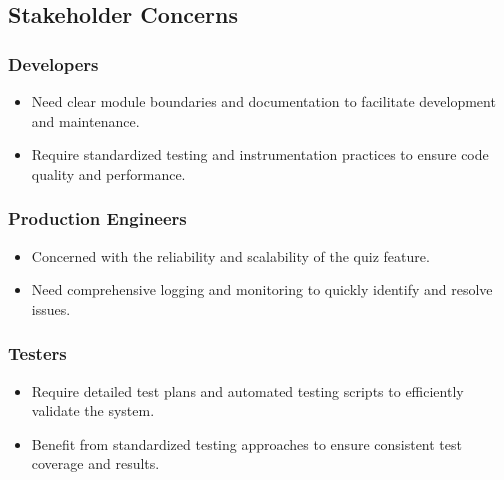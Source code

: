 \subsection{Stakeholder Concerns}

\subsubsection{Developers}

\begin{itemize}
  \item Need clear module boundaries and documentation to facilitate development and maintenance.
  \item Require standardized testing and instrumentation practices to ensure code quality and performance.
\end{itemize}

\subsubsection{Production Engineers}

\begin{itemize}
  \item Concerned with the reliability and scalability of the quiz feature.
  \item Need comprehensive logging and monitoring to quickly identify and resolve issues.
\end{itemize}

\subsubsection{Testers}

\begin{itemize}
  \item Require detailed test plans and automated testing scripts to efficiently validate the system.
  \item Benefit from standardized testing approaches to ensure consistent test coverage and results.
\end{itemize}
